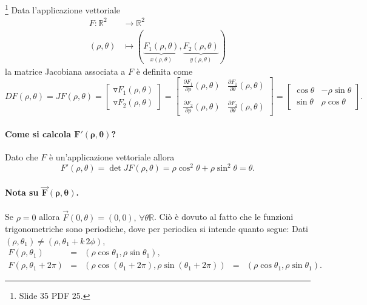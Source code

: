\begin{definition}\footnote{Slide 35 PDF 25.}
	Data l'applicazione vettoriale
	\begin{equation*}
		\begin{aligned}
			F:\mathbb{R}^2 &\rightarrow\mathbb{R}^2\\
			(\rho, \theta) &\mapsto (\underbrace{F_1(\rho, \theta)}_{x(\rho, \theta)}, \underbrace{F_2(\rho, \theta)}_{y(\rho, \theta)})
		\end{aligned}
	\end{equation*}
	la matrice Jacobiana associata a $F$ è definita come
	\begin{equation}\label{eq:matrice_jacobiana}
		DF(\rho, \theta) = JF(\rho, \theta) =
		\begin{bmatrix}
			\triangledown F_1(\rho, \theta)\\
			\triangledown F_2(\rho, \theta)
		\end{bmatrix} =
		\begin{bmatrix}
			\frac{\partial F_1}{\partial \rho}(\rho, \theta) & \frac{\partial F_1}{\partial \theta}(\rho, \theta) \\\\
			\frac{\partial F_2}{\partial \rho}(\rho, \theta) & \frac{\partial F_2}{\partial \theta}(\rho, \theta)
		\end{bmatrix} =
		\begin{bmatrix}
			\cos\theta & -\rho\sin\theta\\
			\sin\theta & \rho\cos\theta
		\end{bmatrix}.
	\end{equation}
\end{definition}

\paragraph{Come si calcola $\boldsymbol{F'(\rho, \theta)}$?} Dato che $F$ è un'applicazione vettoriale allora
\begin{equation*}
	F'(\rho, \theta) = \det JF(\rho, \theta) = \rho \cos^2\theta + \rho \sin^2\theta = \theta.
\end{equation*}

\paragraph{Nota su $\boldsymbol{\vec{F}(\rho, \theta)}$.} Se $\rho=0$ allora $\vec{F}(0, \theta) = (0,0),\, \forall\theta\mathbb{R}$. Ciò è dovuto al fatto che le funzioni trigonometriche sono periodiche, dove per periodica si intende quanto segue: Dati $(\rho, \theta_1)\neq (\rho, \theta_1 + k\,2\phi)$,
\begin{equation*}
	\begin{matrix}
		F(\rho, \theta_1) &=& (\rho \cos\theta_1, \rho \sin\theta_1),\\
	F(\rho, \theta_1 + 2\pi) &=& (\rho \cos(\theta_1 + 2\pi), \rho \sin(\theta_1 + 2\pi)) &=& (\rho \cos\theta_1, \rho \sin\theta_1).
	\end{matrix}
\end{equation*}

